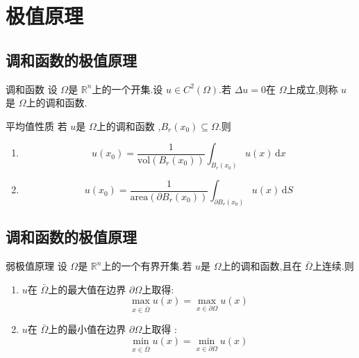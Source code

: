 \documentclass[../../main.tex]{subfiles}
\begin{document}
\chapter{ 极值原理 }

\section{调和函数的极值原理}

\begin{definition}{调和函数}
    设 \(   \Omega   \)是 \(  \mathbb{R} ^{n}  \)上的一个开集.设 \(  u \in C^{2}\left(  \Omega  \right)   \).若 \(   \Delta u= 0  \)在 \(   \Omega   \)上成立,则称 \(  u  \)是 \(   \Omega   \)上的调和函数.       
\end{definition}


\begin{theorem}{平均值性质}
    若 \(  u  \)是 \(   \Omega   \)上的调和函数 ,\(  B_{r}\left( x_0 \right)\subseteq  \Omega    \).则
    \begin{enumerate}
        \item \[
        u\left( x_0 \right)= \frac{1 }{\mathrm{vol}\left( B_{r}\left( x_0 \right)  \right)  }\int_{B_{r}\left( x_0 \right) }u\left( x \right)\,\mathrm{d} x   
        \]
        \item \[
        u\left( x_0 \right)= \frac{1 }{\mathrm{area}\left(  \partial B_{r}\left( x_0 \right)  \right)  }\int_{ \partial B_{r}\left( x_0 \right) }u\left( x \right)\,\mathrm{d} S   
        \]
    \end{enumerate}
       
\end{theorem}


\section{调和函数的极值原理}

\begin{theorem}{弱极值原理}
    设 \(   \Omega   \)是 \(  \mathbb{R} ^{n}  \)上的一个有界开集.若 \(  u  \)是 \(   \Omega   \)上的调和函数,且在 \(   \bar{\Omega}  \)上连续.则
    \begin{enumerate}
        \item \(  u  \)在 \(   \bar{\Omega}  \)上的最大值在边界 \(   \partial  \Omega   \)上取得: \[
        \max _{x\in  \bar{\Omega}}u\left( x \right)= \max _{x\in  \partial  \Omega }u\left( x \right)  
        \]
        \item \(  u  \)在 \(   \bar{\Omega}  \)上的最小值在边界 \(   \partial  \Omega   \)上取得 :  \[
        \min _{x\in  \bar{\Omega}}u\left( x \right)= \min _{x\in  \partial  \Omega }u\left( x \right)  
        \]    
    \end{enumerate}
         
\end{theorem}
\end{document}
